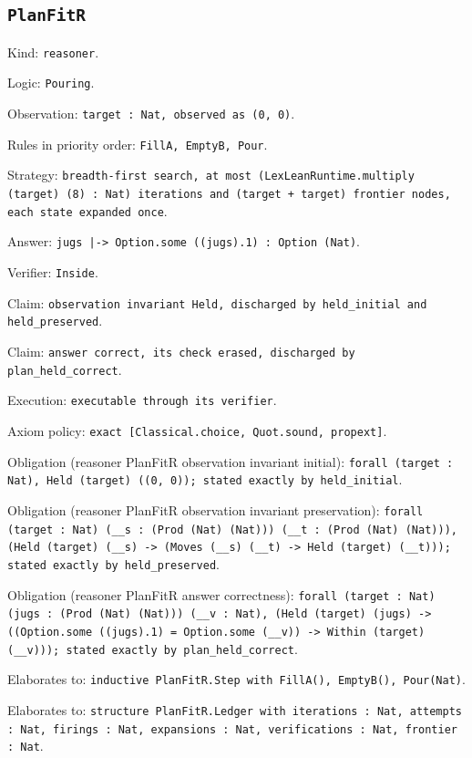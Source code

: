 \documentclass[11pt]{article}
\begin{document}
\subsection*{\texttt{PlanFitR}}
\noindent Kind: \texttt{reasoner}.\par
\noindent Logic: \texttt{Pouring}.\par
\noindent Observation: \texttt{target : Nat, observed as (0, 0)}.\par
\noindent Rules in priority order: \texttt{FillA, EmptyB, Pour}.\par
\noindent Strategy: \texttt{breadth-first search, at most (LexLeanRuntime.multiply (target) (8) : Nat) iterations and (target + target) frontier nodes, each state expanded once}.\par
\noindent Answer: \texttt{jugs |-> Option.some ((jugs).1) : Option (Nat)}.\par
\noindent Verifier: \texttt{Inside}.\par
\noindent Claim: \texttt{observation invariant Held, discharged by held\_initial and held\_preserved}.\par
\noindent Claim: \texttt{answer correct, its check erased, discharged by plan\_held\_correct}.\par
\noindent Execution: \texttt{executable through its verifier}.\par
\noindent Axiom policy: \texttt{exact [Classical.choice, Quot.sound, propext]}.\par
\noindent Obligation (reasoner PlanFitR observation invariant initial): \texttt{forall (target : Nat), Held (target) ((0, 0)); stated exactly by held\_initial}.\par
\noindent Obligation (reasoner PlanFitR observation invariant preservation): \texttt{forall (target : Nat) (\_\_s : (Prod (Nat) (Nat))) (\_\_t : (Prod (Nat) (Nat))), (Held (target) (\_\_s) -> (Moves (\_\_s) (\_\_t) -> Held (target) (\_\_t))); stated exactly by held\_preserved}.\par
\noindent Obligation (reasoner PlanFitR answer correctness): \texttt{forall (target : Nat) (jugs : (Prod (Nat) (Nat))) (\_\_v : Nat), (Held (target) (jugs) -> ((Option.some ((jugs).1) = Option.some (\_\_v)) -> Within (target) (\_\_v))); stated exactly by plan\_held\_correct}.\par
\noindent Elaborates to: \texttt{inductive PlanFitR.Step with FillA(), EmptyB(), Pour(Nat)}.\par
\noindent Elaborates to: \texttt{structure PlanFitR.Ledger with iterations : Nat, attempts : Nat, firings : Nat, expansions : Nat, verifications : Nat, frontier : Nat}.\par
\end{document}
